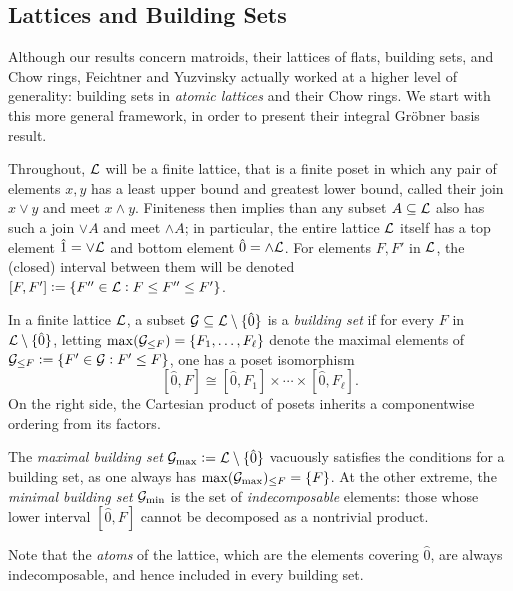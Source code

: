 




\subsection{Lattices and Building Sets} 
\label{building-set-basics}
Although our results concern matroids, their lattices
of flats, building sets, and Chow rings, Feichtner and Yuzvinsky \cite{FY} actually worked at a higher level of generality: building sets in {\it atomic lattices} and their
Chow rings.  We start with this more general framework,
in order to present their integral Gr\"obner basis result.

Throughout, $\mathcal{L}$ will be a finite lattice, that is a finite poset in which any pair of elements $x,y$ has 
a least upper bound and greatest lower bound, called their join $x \vee y$ and meet $x \wedge y$.  Finiteness then implies than any subset $A \subseteq \mathcal{L}$ also has such 
a join $\vee A$ and meet $\wedge A$;  in particular,
the entire lattice
$\mathcal{L}$ itself has a top element $\hat{1}=\vee \mathcal{L}$ 
and bottom element $\hat{0}=\wedge \mathcal{L}$.  
For elements $F,F'$ in $\mathcal{L}$, the (closed) interval between them will be denoted $[F,F']:=\{ F'' \in \mathcal{L}: F \leq F'' \leq F'\}$.

\begin{defn} \cite[Def.~1]{FY}
    In a finite lattice $\mathcal{L}$, a subset $\mathcal{G} \subseteq \mathcal{L} \setminus \{\hat{0}\}$ is a \emph{building set} if for every $F$ in $\mathcal{L} \setminus \{\hat{0}\}$, letting
    $\max(\mathcal{G}_{\leq F})=\{F_1,\ldots,F_\ell\}$ denote the maximal elements of $\mathcal{G}_{\leq F}:=\{F' \in \mathcal{G}: F' \leq F\}$, one has  a poset isomorphism
    \[
        [\hat{0}, F] 
        \cong 
         [\hat{0},F_1] \times \cdots \times [\hat{0},F_\ell].
    \]
    On the right side, the Cartesian product of posets
    inherits a componentwise ordering from its factors.
\end{defn}

\begin{example}
The \emph{maximal building set} $\mathcal{G}_{\max}:=\mathcal{L} \setminus \{\hat{0}\}$ vacuously satisfies the conditions for a building set, as one always has $\max (\mathcal{G}_{\max})_{\leq F}=\{F\}$. 
At the other extreme, the \emph{minimal building set} $\mathcal{G}_{\min}$ is the set of {\it indecomposable} elements: those whose lower interval $[\hat{0}, F]$ cannot be decomposed as a nontrivial product.

 Note that the {\it atoms} of the lattice, which are
 the elements covering $\hat{0}$, are always indecomposable, and hence included in every building set.
\end{example}


